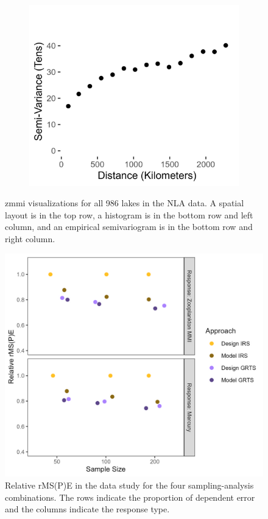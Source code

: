 \documentclass[]{elsarticle} %
\begin{document}
\begin{figure}
\begin{subfigure}{0.49\textwidth}
  \caption*{}
  \label{fig:zmmi_hist}
\end{subfigure}
\begin{subfigure}{0.49\textwidth}
  \centering
  \includegraphics[width = 1\linewidth]{figures/zmmi_sv_plot.jpeg}
  \caption*{}
  \label{fig:zmmi_sv_plot}
\end{subfigure}
\caption{zmmi visualizations for all 986 lakes in the NLA data. A spatial layout is in the top row, a histogram is in the bottom row and left column, and an empirical semivariogram is in the bottom row and right column.}
\label{fig:zmmi}
\end{figure}

\begin{figure}
  \centering
  \includegraphics[width = 1\linewidth]{figures/data_rmspe_eff.jpeg}
  \caption{Relative rMS(P)E in the data study for the four sampling-analysis combinations. The rows indicate the proportion of dependent error and the columns indicate the response type.}
  \label{fig:data_rmspe_eff}
\end{figure}
\end{document}
